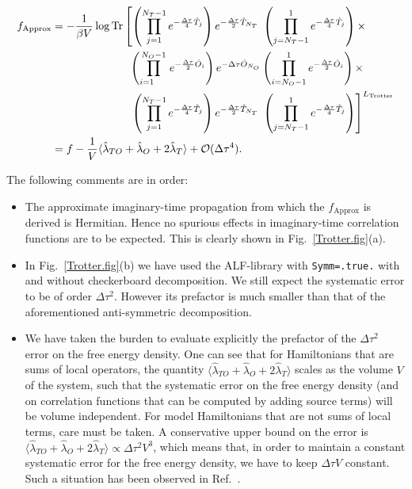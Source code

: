 \begin{align}
\label{eq:f_approx_symm} 
f_{\text{Approx} }  &=  
\begin{aligned}[t]
   -\frac{1}{\beta V } \log \mathop{\mathrm{Tr}} &\left[ \left(\prod_{j=1}^{N_T-1} e^{-\frac{\Delta \tau}{4} \hat{T}_j } \right)    e^{-\frac{\Delta \tau}{2} \hat{T}_{N_T} } \;   
   \left(  \prod_{j=N_T-1}^{1} e^{-\frac{\Delta \tau}{4} \hat{T}_j } \right)  \times   \right. \nonumber \\   
   &\;\;\left(\prod_{i=1\phantom{N_O}}^{N_O-1} e^{-\frac{\Delta \tau}{2} \hat{O}_i } \right)    e^{-\Delta \tau \hat{O}_{N_O} }    
     \left( \prod_{i=N_O-1}^{1} e^{-\frac{\Delta \tau}{2} \hat{O}_i } \right)  \times  \nonumber  \\
   &\;\;\left.   \left(\prod_{j=1}^{N_T-1} e^{-\frac{\Delta \tau}{4} \hat{T}_j } \right)    e^{-\frac{\Delta \tau}{2} \hat{T}_{N_T} }  \;  
   \left(  \prod_{j=N_T-1}^{1} e^{-\frac{\Delta \tau}{4} \hat{T}_j } \right)   
   \right]^{L_{\text{Trotter}}}  \nonumber 
\end{aligned}\\
   &= f    - \frac{1}{V}   \langle \hat{\lambda}_{TO} + \hat{\lambda}_{O} + 2 \hat{\lambda}_{T} \rangle  + \mathcal{O}( \Delta \tau ^4).
\end{align}

The following comments are in order:
\begin{itemize}
\item   The approximate imaginary-time propagation from which the $f_{\text{Approx} } $ is derived is Hermitian.  Hence no spurious effects in imaginary-time correlation functions are to be expected.  This is clearly shown in Fig.~\ref{Trotter.fig}(a).
\item  In Fig.~\ref{Trotter.fig}(b) we  have used the ALF-library with   \texttt{Symm=.true.}  with and without checkerboard decomposition.  We still expect the systematic error to be of order $\Delta \tau ^2 $.  However its prefactor is much smaller than that of the aforementioned  anti-symmetric decomposition.
\item   We have taken the burden to evaluate explicitly the prefactor of the $\Delta \tau ^2$ error on the free energy density.  One can  see that for Hamiltonians  that are sums of local  operators, the quantity $ \langle \hat{\lambda}_{TO} + \hat{\lambda}_{O} + 2 \hat{\lambda}_{T} \rangle  $ scales as the volume $V$  of the system, such that the systematic error on the free energy density (and on correlation functions that can be computed  by adding source terms)  will be  volume  independent. For model  Hamiltonians that are not sums of local terms, care must be taken.  A conservative upper bound on the  error is $ \langle \hat{\lambda}_{TO} + \hat{\lambda}_{O} + 2 \hat{\lambda}_{T} \rangle    \propto \Delta \tau^2 V^3 $, which means that, in order to maintain a constant systematic error for the free energy density, we have to keep $ \Delta \tau V $ constant. Such a situation has been observed in Ref.~\cite{WangZ20}.
\end{itemize}


